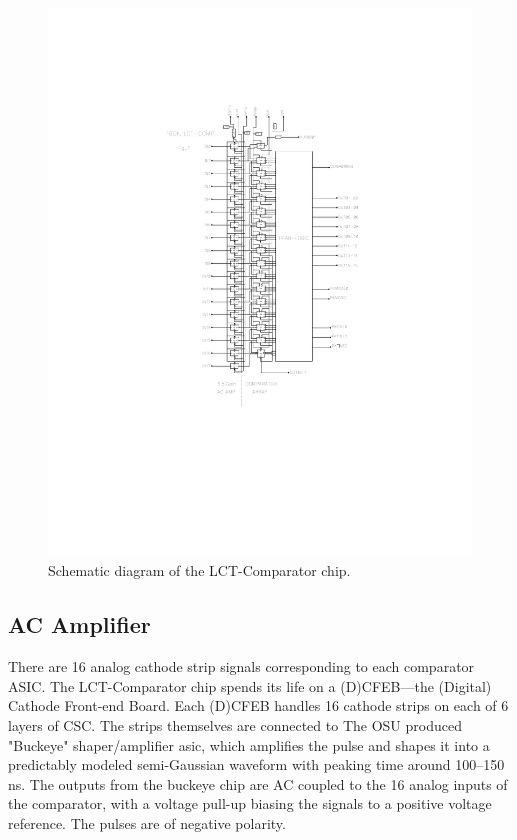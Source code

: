 \documentclass[letterpaper]{article}
\begin{document}
\begin{figure}[H]
\centering
\includegraphics[keepaspectratio=true, width=1.1 \textwidth]{Images/amplifier_comparator_array_3.pdf}
\caption{Schematic diagram of the LCT-Comparator chip.}
\end{figure}

\subsection{AC Amplifier}\label{sec:ac-amplifier}

There are 16 analog cathode strip signals corresponding to each comparator ASIC.
The LCT-Comparator chip spends its life on a (D)CFEB---the (Digital) Cathode Front-end Board. Each (D)CFEB handles 16 cathode strips on each of 6 layers of CSC. The strips themselves are connected to The OSU produced "Buckeye" shaper/amplifier asic, which amplifies the pulse and shapes it into a predictably modeled semi-Gaussian waveform with peaking time around 100--150 ns.  The outputs from the buckeye chip are AC coupled to the 16 analog inputs of the comparator, with a voltage pull-up biasing the signals to a positive voltage reference. The pulses are of negative polarity.
\end{document}

